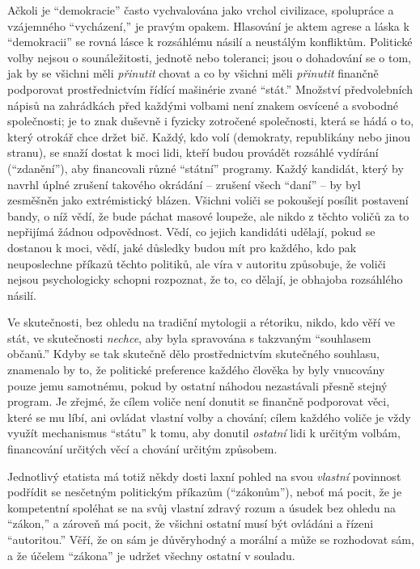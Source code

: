 \documentclass{book}
\begin{document}
Ačkoli je \enquote{demokracie} často vychvalována jako vrchol civilizace, spolupráce a vzájemného \enquote{vycházení,} je pravým opakem. Hlasování je aktem agrese a láska k \enquote{demokracii} se rovná lásce k rozsáhlému násilí a neustálým konfliktům. Politické volby nejsou o sounáležitosti, jednotě nebo toleranci; jsou o dohadování se o tom, jak by se všichni měli \emph{přinutit} chovat a co by všichni měli \emph{přinutit} finančně podporovat prostřednictvím řídící mašinérie zvané \enquote{stát.} Množství předvolebních nápisů na zahrádkách před každými volbami není znakem osvícené a svobodné společnosti; je to znak duševně i fyzicky zotročené společnosti, která se hádá o to, který otrokář chce držet bič. Každý, kdo volí (demokraty, republikány nebo jinou stranu), se snaží dostat k moci lidi, kteří budou provádět rozsáhlé vydírání (\enquote{zdanění}), aby financovali různé \enquote{státní} programy. Každý kandidát, který by navrhl úplné zrušení takového okrádání -- zrušení všech \enquote{daní} -- by byl zesměšněn jako extrémistický blázen. Všichni voliči se pokoušejí posílit postavení bandy, o níž vědí, že bude páchat masové loupeže, ale nikdo z těchto voličů za to nepřijímá žádnou odpovědnost. Vědí, co jejich kandidáti udělají, pokud se dostanou k moci, vědí, jaké důsledky budou mít pro každého, kdo pak neuposlechne příkazů těchto politiků, ale víra v autoritu způsobuje, že voliči nejsou psychologicky schopni rozpoznat, že to, co dělají, je obhajoba rozsáhlého násilí.

Ve skutečnosti, bez ohledu na tradiční mytologii a rétoriku, nikdo, kdo věří ve stát, ve skutečnosti \emph{nechce}, aby byla spravována s takzvaným \enquote{souhlasem občanů.} Kdyby se tak skutečně dělo prostřednictvím skutečného souhlasu, znamenalo by to, že politické preference každého člověka by byly vnucovány pouze jemu samotnému, pokud by ostatní náhodou nezastávali přesně stejný program. Je zřejmé, že cílem voliče není donutit se finančně podporovat věci, které se mu líbí, ani ovládat vlastní volby a chování; cílem každého voliče je vždy využít mechanismus \enquote{státu} k tomu, aby donutil \emph{ostatní} lidi k určitým volbám, financování určitých věcí a chování určitým způsobem.

Jednotlivý etatista má totiž někdy dosti laxní pohled na svou \emph{vlastní} povinnost podřídit se nesčetným politickým příkazům (\enquote{zákonům}), neboť má pocit, že je kompetentní spoléhat se na svůj vlastní zdravý rozum a úsudek bez ohledu na \enquote{zákon,} a zároveň má pocit, že všichni ostatní musí být ovládáni a řízeni \enquote{autoritou.} Věří, že on sám je důvěryhodný a morální a může se rozhodovat sám, a že účelem \enquote{zákona} je udržet všechny ostatní v souladu.
\end{document}
